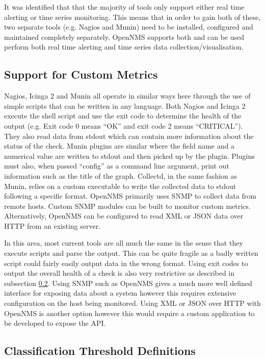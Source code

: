 \documentclass[bsc,deptreport,twoside,parskip,singlespacing,notimes]{infthesis}
\begin{document}
	It was identified that that the majority of tools only support either real time
	alerting or time series monitoring.  This means that in order to gain both of
	these, two separate tools (e.g. Nagios and Munin) need to be installed,
	configured and maintained completely separately.  OpenNMS supports both and can
	be used perform both real time alerting and time series data
	collection/visualisation.

\subsection{Support for Custom Metrics}

	Nagios, Icinga 2 and Munin all operate in similar ways here through the use of
	simple scripts that can be written in any language.  Both Nagios and Icinga 2
	execute the shell script and use the exit code to determine the health of the
	output (e.g. Exit code 0 means ``OK'' and exit code 2 means ``CRITICAL'').  They
	also read data from stdout which can contain more information about the status
	of the check.  Munin plugins are similar where the field name and a numerical
	value are written to stdout and then picked up by the plugin.  Plugins must
	also, when passed ``config'' as a command line argument, print out information
	such as the title of the graph. Collectd, in the same fashion as Munin, relies
	on a custom executable to write the collected data to stdout following a
	specific format.  OpenNMS primarily uses SNMP to collect data from remote
	hosts.  Custom SNMP modules can be built to monitor custom metrics. 
	Alternatively, OpenNMS can be configured to read XML or JSON data over HTTP
	from an existing server. %


	In this area, most current tools are all much the same in the sense that they
	execute scripts and parse the output. This can be quite fragile as a badly
	written script could fairly easily output data in the wrong format. Using exit
	codes to output the overall health of a check is also very restrictive as
	described in subsection \ref{classification-threshold-definitions}. Using SNMP
	such as OpenNMS gives a much more well defined interface for exposing data
	about a system however this requires extensive configuration on the host being
	monitored.  Using XML or JSON over HTTP with OpenNMS is another option however
	this would require a custom application to be developed to expose the API.

\subsection{Classification Threshold Definitions}
\label{classification-threshold-definitions}
\end{document}
